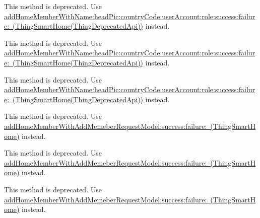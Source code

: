 \begin{DoxyRefList}
\label{deprecated__deprecated000061}%
%
This method is deprecated. Use \mbox{\hyperlink{category_thing_smart_home_07_thing_deprecated_api_08_ab4ef49d6ad98738dfbe78948ba41d7e2}{add\+Home\+Member\+With\+Name\+:head\+Pic\+:country\+Code\+:user\+Account\+:role\+:success\+:failure\+: (\+Thing\+Smart\+Home(\+Thing\+Deprecated\+Api))}} instead. 

\label{deprecated__deprecated000043}%
%
This method is deprecated. Use \mbox{\hyperlink{category_thing_smart_home_07_thing_deprecated_api_08_ab4ef49d6ad98738dfbe78948ba41d7e2}{add\+Home\+Member\+With\+Name\+:head\+Pic\+:country\+Code\+:user\+Account\+:role\+:success\+:failure\+: (\+Thing\+Smart\+Home(\+Thing\+Deprecated\+Api))}} instead. 

\label{deprecated__deprecated000025}%
%
This method is deprecated. Use \mbox{\hyperlink{category_thing_smart_home_07_thing_deprecated_api_08_ab4ef49d6ad98738dfbe78948ba41d7e2}{add\+Home\+Member\+With\+Name\+:head\+Pic\+:country\+Code\+:user\+Account\+:role\+:success\+:failure\+: (\+Thing\+Smart\+Home(\+Thing\+Deprecated\+Api))}} instead.  
\item[(Thing\+Deprecated\+Api) Member \mbox{\hyperlink{category_thing_smart_home_07_thing_deprecated_api_08_ab4ef49d6ad98738dfbe78948ba41d7e2}{\mbox{[}Thing\+Smart\+Home(Thing\+Deprecated\+Api) add\+Home\+Member\+With\+Name\+:head\+Pic\+:country\+Code\+:user\+Account\+:role\+:success\+:failure\+:\mbox{]}}} ]\label{deprecated__deprecated000044}%
%
This method is deprecated. Use \mbox{\hyperlink{interface_thing_smart_home_a67a1c33e2358715a749881ff8a791843}{add\+Home\+Member\+With\+Add\+Memeber\+Request\+Model\+:success\+:failure\+: (\+Thing\+Smart\+Home)}} instead. 

\label{deprecated__deprecated000026}%
%
This method is deprecated. Use \mbox{\hyperlink{interface_thing_smart_home_a67a1c33e2358715a749881ff8a791843}{add\+Home\+Member\+With\+Add\+Memeber\+Request\+Model\+:success\+:failure\+: (\+Thing\+Smart\+Home)}} instead. 

\label{deprecated__deprecated000008}%
%
This method is deprecated. Use \mbox{\hyperlink{interface_thing_smart_home_a67a1c33e2358715a749881ff8a791843}{add\+Home\+Member\+With\+Add\+Memeber\+Request\+Model\+:success\+:failure\+: (\+Thing\+Smart\+Home)}} instead. 


\end{DoxyRefList}
